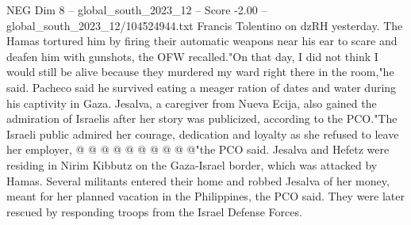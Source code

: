 \begin{textsample}{NEG Dim 8 – global\_south\_2023\_12 – Score -2.00 – global\_south\_2023\_12/104524944.txt}
Francis Tolentino on dzRH yesterday.
The Hamas tortured him by firing their automatic weapons near his ear to scare and deafen him with gunshots, the OFW recalled."On that day, I did not think I would still be alive because they murdered my ward right there in the room,"he said.
Pacheco said he survived eating a meager ration of dates and water during his captivity in Gaza.
Jesalva, a caregiver from Nueva Ecija, also gained the admiration of Israelis after her story was publicized, according to the PCO."The Israeli public admired her courage, dedication and loyalty as she refused to leave her employer, @ @ @ @ @ @ @ @ @ @"the PCO said.
Jesalva and Hefetz were residing in Nirim Kibbutz on the Gaza-Israel border, which was attacked by Hamas.
Several militants entered their home and robbed Jesalva of her money, meant for her planned vacation in the Philippines, the PCO said.
They were later rescued by responding troops from the Israel Defense Forces.

\end{textsample}
